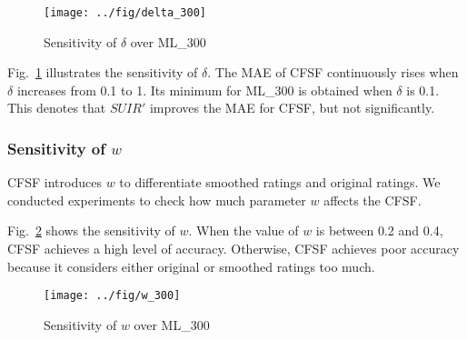 \begin{figure}[h]
  \centering
  \texttt{[image: ../fig/delta\_300]}
  \vspace{-2ex}\caption{Sensitivity of $\delta$ over ML\_300}\label{fig:delta}
\end{figure}

Fig.~\ref{fig:delta} illustrates the sensitivity of $\delta$. The MAE of CFSF continuously rises when $\delta$ increases from 0.1 to 1. Its minimum for ML\_300 is obtained when $\delta$ is 0.1. This denotes that $SUIR'$ improves the MAE for CFSF, but not significantly.

\subsubsection{Sensitivity of $w$}
CFSF introduces $w$ to differentiate smoothed ratings and original ratings. We conducted experiments to check how much parameter $w$ affects the CFSF.

Fig.~\ref{fig:w} shows the sensitivity of $w$. When the value of $w$ is between 0.2 and 0.4, CFSF achieves a high level of accuracy. Otherwise, CFSF achieves poor accuracy because it considers either original or smoothed ratings too much.

\begin{figure}[bt]
  \centering
  \texttt{[image: ../fig/w\_300]}
  \vspace{-2ex}\caption{Sensitivity of $w$ over ML\_300}\label{fig:w}
\end{figure}


